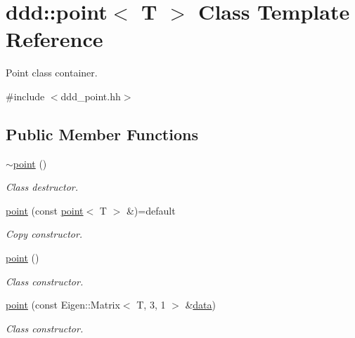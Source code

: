 \hypertarget{classddd_1_1point}{}\section{ddd\+:\+:point$<$ T $>$ Class Template Reference}
\label{classddd_1_1point}


Point class container.  




{\ttfamily \#include $<$ddd\+\_\+point.\+hh$>$}

\subsection*{Public Member Functions}
\begin{DoxyCompactItemize}
\item 
\mbox{\label{classddd_1_1point_ab946d459bb160ea06b49c10c3d0dac65}} 
\hyperlink{classddd_1_1point_ab946d459bb160ea06b49c10c3d0dac65}{$\sim$point} ()
\begin{DoxyCompactList}\small\item\em Class destructor. \end{DoxyCompactList}\item 
\mbox{\label{classddd_1_1point_a09fb0691923b2dad58f9e5e2eb89bc9c}} 
\hyperlink{classddd_1_1point_a09fb0691923b2dad58f9e5e2eb89bc9c}{point} (const \hyperlink{classddd_1_1point}{point}$<$ T $>$ \&)=default
\begin{DoxyCompactList}\small\item\em Copy constructor. \end{DoxyCompactList}\item 
\mbox{\label{classddd_1_1point_a38a912e04a5429e7416bea414482a5a5}} 
\hyperlink{classddd_1_1point_a38a912e04a5429e7416bea414482a5a5}{point} ()
\begin{DoxyCompactList}\small\item\em Class constructor. \end{DoxyCompactList}\item 
\hyperlink{classddd_1_1point_a0146118d518509e9e7cdf4fb6733eb48}{point} (const Eigen\+::\+Matrix$<$ T, 3, 1 $>$ \&\hyperlink{classddd_1_1point_a7589c5f8a9b9a93803dd050ebc9b54a0}{data})
\begin{DoxyCompactList}\small\item\em Class constructor. \end{DoxyCompactList}\item 

\end{DoxyCompactItemize}
